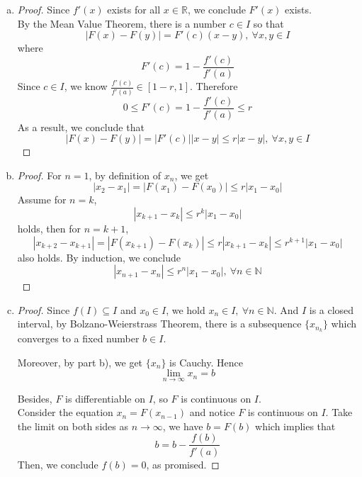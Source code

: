 \documentclass{report}
\begin{document}
\setcounter{Exercise}{6}
\vspace{12pt}
\begin{Exercise}
\begin{enumerate}[a)]
\item 
\begin{proof}
Since $f'(x)$ exists for all $x \in \mathbb{R}$, we conclude $F'(x)$ exists. \\
By the Mean Value Theorem, there is a number $c \in I$ so that $$ |F(x)-F(y)| = F'(c)(x-y),\ \forall x,y \in I$$
where $$F'(c) = 1-\frac{f'(c)}{f'(a)}$$
Since $c \in I$, we know $\frac{f'(c)}{f'(a)} \in [1-r,1]$. Therefore $$ 0 \leq F'(c) = 1-\frac{f'(c)}{f'(a)} \leq r$$
As a result, we conclude that $$|F(x)-F(y)| = |F'(c)||x-y| \leq r|x-y|,\ \forall x,y \in I $$
\end{proof}

\item
\begin{proof}
For $n=1$, by definition of $x_n$, we get $$|x_2-x_1| = |F(x_1)-F(x_0)| \leq r|x_1-x_0|$$
Assume for $n=k$, $$|x_{k+1}-x_{k}| \leq r^k|x_1-x_0|$$ holds, then for $n=k+1$, $$|x_{k+2}-x_{k+1}| = |F(x_{k+1})-F(x_{k})| \leq r|x_{k+1}-x_{k}| \leq r^{k+1}|x_1-x_0|$$ also holds.
By induction, we conclude $$|x_{n+1}-x_{n}| \leq r^n|x_1-x_0|,\ \forall n \in \mathbb{N}$$
\end{proof}

\item 
\begin{proof}
Since $f(I) \subseteq I$ and $x_0 \in I$, we hold $x_n \in I,\ \forall n \in \mathbb{N}$. And $I$ is a closed interval, by Bolzano-Weierstrass Theorem, there is a subsequence $\{x_{n_k}\}$ which converges to a fixed number $b \in I$.

\vspace{1ex}

Moreover, by part b), we get $ \{x_n\}$  is Cauchy. Hence $$\lim_{n\to\infty} x_n = b $$

Besides, $F$ is differentiable on $I$, so $F$ is continuous on $I$. \\
Consider the equation $x_n = F(x_{n-1})$ and notice $F$ is continuous on $I$. Take the limit on both sides as $n\to\infty$, we have $b=F(b)$ which implies that $$b=b-\frac{f(b)}{f'(a)}$$
Then, we conclude $f(b)=0$, as promised.
\end{proof}
\end{enumerate}
\end{Exercise}
\end{document}
